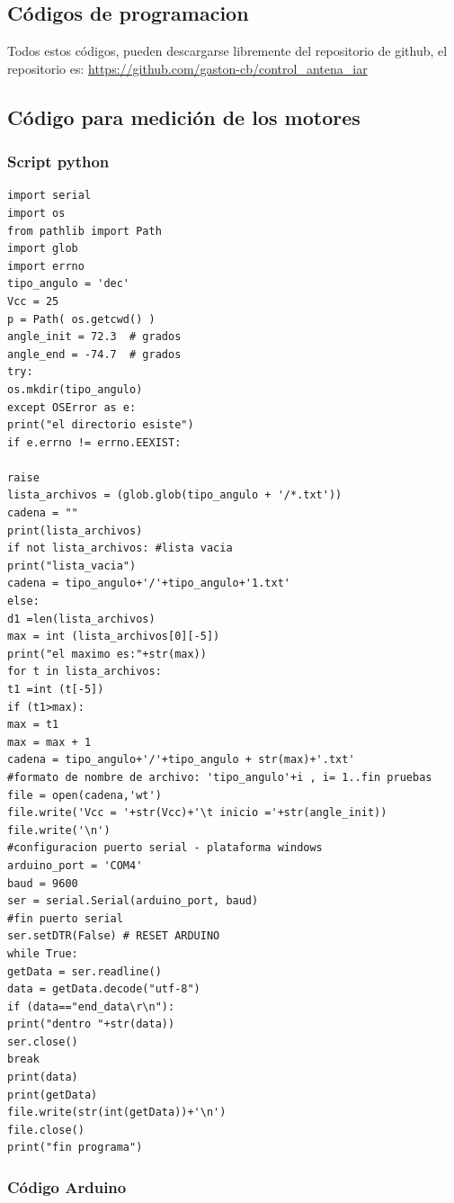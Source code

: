 \begin{appendices}

	\chapter{Códigos de programacion}
	Todos estos códigos, pueden descargarse libremente del repositorio de github, el repositorio es: \url{https://github.com/gaston-cb/control_antena_iar}
\section{Código para medición de los motores}
\subsection{Script python} 
\begin{verbatim}
import serial
import os     
from pathlib import Path  
import glob 
import errno
tipo_angulo = 'dec'     
Vcc = 25
p = Path( os.getcwd() )
angle_init = 72.3  # grados    
angle_end = -74.7  # grados 
try:
os.mkdir(tipo_angulo) 
except OSError as e:
print("el directorio esiste")
if e.errno != errno.EEXIST:

raise
lista_archivos = (glob.glob(tipo_angulo + '/*.txt')) 
cadena = "" 
print(lista_archivos)
if not lista_archivos: #lista vacia     
print("lista_vacia")
cadena = tipo_angulo+'/'+tipo_angulo+'1.txt' 
else: 
d1 =len(lista_archivos)
max = int (lista_archivos[0][-5])
print("el maximo es:"+str(max))
for t in lista_archivos:
t1 =int (t[-5]) 
if (t1>max):
max = t1 
max = max + 1 
cadena = tipo_angulo+'/'+tipo_angulo + str(max)+'.txt' 
#formato de nombre de archivo: 'tipo_angulo'+i , i= 1..fin pruebas 
file = open(cadena,'wt') 
file.write('Vcc = '+str(Vcc)+'\t inicio ='+str(angle_init))  
file.write('\n')   
#configuracion puerto serial - plataforma windows 
arduino_port = 'COM4'
baud = 9600 
ser = serial.Serial(arduino_port, baud) 
#fin puerto serial 
ser.setDTR(False) # RESET ARDUINO  
while True:
getData = ser.readline()   
data = getData.decode("utf-8")
if (data=="end_data\r\n"):
print("dentro "+str(data)) 
ser.close() 
break 
print(data)
print(getData)  
file.write(str(int(getData))+'\n')          
file.close()
print("fin programa")
\end{verbatim}

\subsection{Código Arduino}


\end{appendices}
